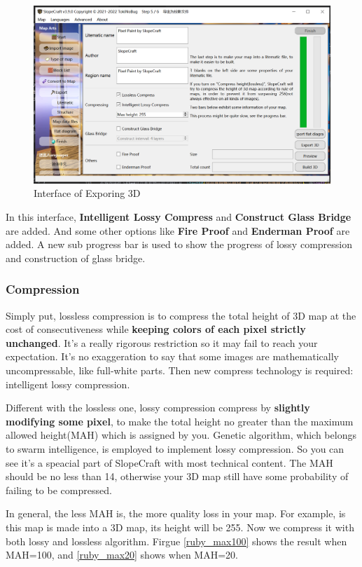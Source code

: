 \documentclass{article}
\begin{document}
\begin{figure}[htbp]
    \centering
    \includegraphics[width=15cm]{Img2_Export3D.png}
    \caption{Interface of Exporing 3D}
\end{figure}

In this interface, \textbf{Intelligent Lossy Compress} and \textbf{Construct Glass Bridge} are added. And some other options like \textbf{Fire Proof} and \textbf{Enderman Proof} are added. A new sub progress bar is used to show the progress of lossy compression and construction of glass bridge.

\subsubsection{Compression}
Simply put, lossless compression is to compress the total height of 3D map at the cost of consecutiveness while \textbf{keeping colors of each pixel strictly unchanged}. It's a really rigorous restriction so it may fail to reach your expectation. It's no exaggeration to say that some images are mathematically uncompressable, like full-white parts. Then new compress technology is required: intelligent lossy compression.

Different with the lossless one, lossy compression compress by \textbf{slightly modifying some pixel}, to make the total height no greater than the maximum allowed height(MAH) which is assigned by you. Genetic algorithm, which belongs to swarm intelligence, is employed to implement lossy compression. So you can see it's a speacial part of SlopeCraft with most technical content. The MAH should be no less than 14, otherwise your 3D map still have some probability of failing to be compressed.

In general, the less MAH is, the more quality loss in your map. For example, is this map is made into a 3D map, its height will be 255. Now we compress it with both lossy and lossless algorithm. Firgue \ref*{ruby_max100} shows the result when MAH=100, and \ref*{ruby_max20} shows when MAH=20.
\end{document}
